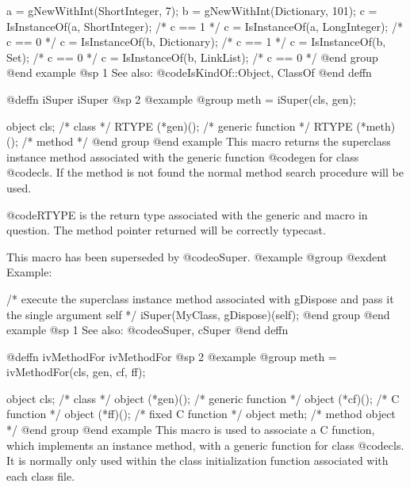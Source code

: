 {{{{a = gNewWithInt(ShortInteger, 7);
b = gNewWithInt(Dictionary, 101);
c = IsInstanceOf(a, ShortInteger);  /* c == 1  */
c = IsInstanceOf(a, LongInteger);   /* c == 0  */
c = IsInstanceOf(b, Dictionary);    /* c == 1  */
c = IsInstanceOf(b, Set);           /* c == 0  */
c = IsInstanceOf(b, LinkList);      /* c == 0  */
@end group
@end example
@sp 1
See also:  @code{IsKindOf::Object, ClassOf}
@end deffn










@deffn {iSuper} iSuper
@sp 2
@example
@group
meth = iSuper(cls, gen);

object  cls;            /*  class               */
RTYPE   (*gen)();       /*  generic function    */
RTYPE   (*meth)();      /*  method              */
@end group
@end example
This macro returns the superclass instance method associated with the
generic function @code{gen} for class @code{cls}.  If the method is not
found the normal method search procedure will be used.

@code{RTYPE} is the return type associated with the generic and
macro in question.  The method pointer returned will be correctly
typecast.

This macro has been superseded by @code{oSuper}.
@example
@group
@exdent Example:

 /* execute the superclass instance
    method associated with gDispose
    and pass it the single argument self  */
iSuper(MyClass, gDispose)(self);
@end group
@end example
@sp 1
See also:  @code{oSuper, cSuper}
@end deffn











@deffn {ivMethodFor} ivMethodFor
@sp 2
@example
@group
meth = ivMethodFor(cls, gen, cf, ff);

object  cls;            /*  class               */
object  (*gen)();       /*  generic function    */
object  (*cf)();        /*  C function          */
object  (*ff)();        /*  fixed C function    */
object  meth;           /*  method object       */
@end group
@end example
This macro is used to associate a C function, which implements an
instance method, with a generic function for class @code{cls}.  It is
normally only used within the class initialization function associated
with each class file.

}}}}
